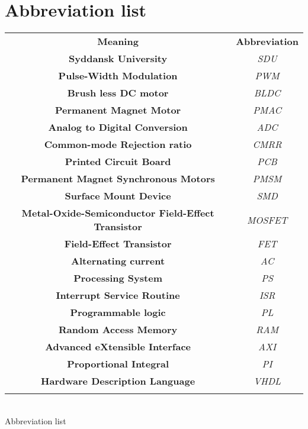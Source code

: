 \section{Abbreviation list}

\begin{center}
\begin{tabular}{|c|c|} \cline{1-2}
\textbf{Meaning} & \textbf{Abbreviation} \\ \cline{1-2}
\textbf{Syddansk University} & \textit{SDU} \\ \cline{1-2}
\textbf{Pulse-Width Modulation} & \textit{PWM} \\ \cline{1-2}
\textbf{Brush less DC motor} & \textit{BLDC} \\ \cline{1-2}
\textbf{Permanent Magnet Motor} & \textit{PMAC} \\ \cline{1-2}
\textbf{Analog to Digital Conversion} & \textit{ADC} \\ \cline{1-2}
\textbf{Common-mode Rejection ratio} & \textit{CMRR} \\ \cline{1-2}
\textbf{Printed Circuit Board} & \textit{PCB} \\ \cline{1-2}
\textbf{Permanent Magnet Synchronous Motors} & \textit{PMSM} \\ \cline{1-2}
\textbf{Surface Mount Device} & \textit{SMD} \\ \cline{1-2}
\textbf{Metal-Oxide-Semiconductor Field-Effect Transistor} & \textit{MOSFET} \\ \cline{1-2}
\textbf{Field-Effect Transistor} & \textit{FET} \\ \cline{1-2}
\textbf{Alternating current} & \textit{AC} \\ \cline{1-2}
\textbf{Processing System} & \textit{PS} \\ \cline{1-2}
\textbf{Interrupt Service Routine} & \textit{ISR} \\ \cline{1-2}
\textbf{Programmable logic} & \textit{PL} \\ \cline{1-2}
\textbf{Random Access Memory} & \textit{RAM} \\ \cline{1-2}
\textbf{Advanced eXtensible Interface} & \textit{AXI} \\ \cline{1-2}
\textbf{Proportional Integral} & \textit{PI} \\ \cline{1-2}
\textbf{Hardware Description Language} & \textit{VHDL} \\ \cline{1-2}
\textbf{} & \textit{} \\ \cline{1-2}
\end{tabular} \\
\caption{Abbreviation list}\label{Abbreviationlist}
\label{tab:variable_ids}
\end{center}